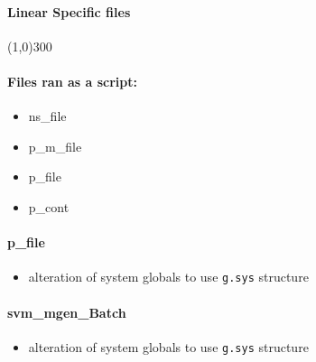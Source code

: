 \documentclass[12pt]{article}
\begin{document}
\paragraph{Linear Specific files}\line(1,0){300}

\paragraph{Files ran as a script:}
	\begin{itemize}
		\item ns\_file
		\item p\_m\_file
		\item p\_file
		\item p\_cont
	\end{itemize}
	
\paragraph{p\_file}
	\begin{itemize}
		\item alteration of system globals to use \verb|g.sys| structure
	\end{itemize}

\paragraph{svm\_mgen\_Batch}
	\begin{itemize}
		\item alteration of system globals to use \verb|g.sys| structure
	\end{itemize}
\end{document}
